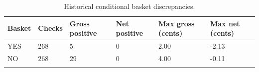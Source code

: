 \begin{table}[htbp]\centering
{\fontsize{9.4}{12}\selectfont\renewcommand{\arraystretch}{1.18}\setlength{\tabcolsep}{4pt}
\begin{tabularx}{\linewidth}{@{}L{19mm}C{17mm}C{29mm}C{26mm}C{34mm}X@{}}\toprule{}
\textbf{Basket} & \textbf{Checks} & \textbf{Gross positive} & \textbf{Net positive} & \textbf{Max gross (cents)} & \textbf{Max net (cents)} \\ \midrule
YES & 268 & 5 & 0 & 2.00 & -2.13 \\ \hline
NO & 268 & 29 & 0 & 4.00 & -0.11 \\ \hline
{}\bottomrule\end{tabularx}}
\caption[Historical conditional basket discrepancies]{Historical conditional basket discrepancies.}\label{tab:historical}
\end{table}
